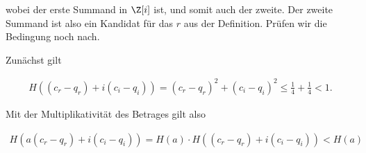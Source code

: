 \begin{solution}
wobei der erste Summand in $\Z [i]$ ist, und somit auch der zweite. Der zweite Summand ist also ein Kandidat für das $r$ aus der Definition. Prüfen wir die Bedingung noch nach.

Zunächst gilt

\begin{align*}
  H((c_r- q_r) + i (c_i - q_i)) = (c_r- q_r)^2 + (c_i - q_i)^2 \leq \frac{1}{4} + \frac{1}{4} < 1.
\end{align*}

Mit der Multiplikativität des Betrages gilt also

\begin{align*}
  H(a(c_r- q_r) + i (c_i - q_i)) = H(a) \cdot H((c_r- q_r) + i (c_i - q_i)) < H(a)
\end{align*}


\end{solution}

